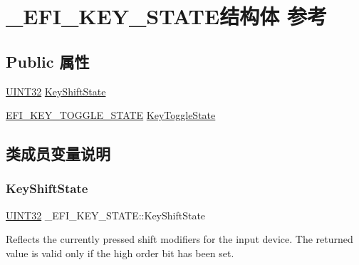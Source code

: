 \hypertarget{struct___e_f_i___k_e_y___s_t_a_t_e}{}\section{\+\_\+\+E\+F\+I\+\_\+\+K\+E\+Y\+\_\+\+S\+T\+A\+T\+E结构体 参考}
\label{struct___e_f_i___k_e_y___s_t_a_t_e}
\subsection*{Public 属性}
\begin{DoxyCompactItemize}
\item 
\hyperlink{_processor_bind_8h_ae1e6edbbc26d6fbc71a90190d0266018}{U\+I\+N\+T32} \hyperlink{struct___e_f_i___k_e_y___s_t_a_t_e_a6ccbb753cd1bfa372cfb703159f2c6fe}{Key\+Shift\+State}
\item 
\hyperlink{_simple_text_in_ex_8h_a5c5344195ec40b3af99801ca3ccd6b2a}{E\+F\+I\+\_\+\+K\+E\+Y\+\_\+\+T\+O\+G\+G\+L\+E\+\_\+\+S\+T\+A\+TE} \hyperlink{struct___e_f_i___k_e_y___s_t_a_t_e_a5c0e0c6c75d3fcece61be5d3281a7ad4}{Key\+Toggle\+State}
\end{DoxyCompactItemize}


\subsection{类成员变量说明}
\mbox{\label{struct___e_f_i___k_e_y___s_t_a_t_e_a6ccbb753cd1bfa372cfb703159f2c6fe}} 
\subsubsection{\texorpdfstring{Key\+Shift\+State}{KeyShiftState}}
{\footnotesize\ttfamily \hyperlink{_processor_bind_8h_ae1e6edbbc26d6fbc71a90190d0266018}{U\+I\+N\+T32} \+\_\+\+E\+F\+I\+\_\+\+K\+E\+Y\+\_\+\+S\+T\+A\+T\+E\+::\+Key\+Shift\+State}

Reflects the currently pressed shift modifiers for the input device. The returned value is valid only if the high order bit has been set. \mbox{\label{struct___e_f_i___k_e_y___s_t_a_t_e_a5c0e0c6c75d3fcece61be5d3281a7ad4}} 
